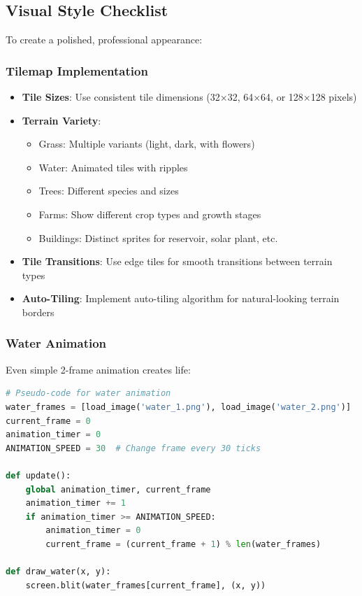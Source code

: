 \documentclass[12pt,a4paper]{article}
\begin{document}
\subsection{Visual Style Checklist}

To create a polished, professional appearance:

\subsubsection{Tilemap Implementation}

\begin{itemize}
    \item \textbf{Tile Sizes}: Use consistent tile dimensions (32×32, 64×64, or 128×128 pixels)
    \item \textbf{Terrain Variety}:
    \begin{itemize}
        \item Grass: Multiple variants (light, dark, with flowers)
        \item Water: Animated tiles with ripples
        \item Trees: Different species and sizes
        \item Farms: Show different crop types and growth stages
        \item Buildings: Distinct sprites for reservoir, solar plant, etc.
    \end{itemize}
    \item \textbf{Tile Transitions}: Use edge tiles for smooth transitions between terrain types
    \item \textbf{Auto-Tiling}: Implement auto-tiling algorithm for natural-looking terrain borders
\end{itemize}

\subsubsection{Water Animation}

Even simple 2-frame animation creates life:

\begin{lstlisting}[language=Python]
# Pseudo-code for water animation
water_frames = [load_image('water_1.png'), load_image('water_2.png')]
current_frame = 0
animation_timer = 0
ANIMATION_SPEED = 30  # Change frame every 30 ticks

def update():
    global animation_timer, current_frame
    animation_timer += 1
    if animation_timer >= ANIMATION_SPEED:
        animation_timer = 0
        current_frame = (current_frame + 1) % len(water_frames)

def draw_water(x, y):
    screen.blit(water_frames[current_frame], (x, y))
\end{lstlisting}
\end{document}
